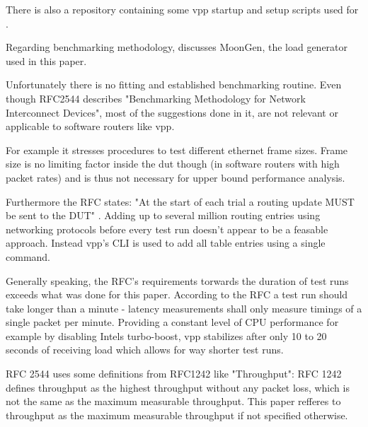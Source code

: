 There is also a repository \cite{github:vpp-bench} containing some
\Ac{vpp} startup and setup scripts used for
\cite{linguaglossa2017high}.


Regarding benchmarking methodology, \cite{emmerich2015moongen}
discusses MoonGen, the load generator used in this paper.


Unfortunately there is no fitting and established benchmarking
routine. Even though RFC2544 \cite{rfc2544} describes "Benchmarking
Methodology for Network Interconnect Devices", most of the suggestions
done in it, are not relevant or applicable to software routers like
\Ac{vpp}.


For example it stresses procedures to test different ethernet frame
sizes. Frame size is no limiting factor inside the \Ac{dut} though (in
software routers with high packet rates) and is thus not necessary for
upper bound performance analysis. \cite{emmerich2015assessing}


Furthermore the RFC states: "At the start of each trial a routing
update MUST be sent to the DUT" \cite{rfc2544}. Adding up to several
million routing entries using networking protocols before every test
run doesn't appear to be a feasable approach. Instead \Ac{vpp}'s CLI
is used to add all table entries using a single command.


Generally speaking, the RFC's requirements torwards the duration of
test runs exceeds what was done for this paper. According to the RFC a
test run should take longer than a minute - latency measurements shall
only measure timings of a single packet per minute. Providing a
constant level of CPU performance for example by disabling Intels
turbo-boost, \Ac{vpp} stabilizes after only 10 to 20 seconds of
receiving load which allows for way shorter test runs.


RFC 2544 uses some definitions from RFC1242 \cite{rfc1242} like
"Throughput": RFC 1242 defines throughput as the highest throughput
without any packet loss, which is not the same as the maximum
measurable throughput. This paper refferes to throughput as the
maximum measurable throughput if not specified otherwise.


